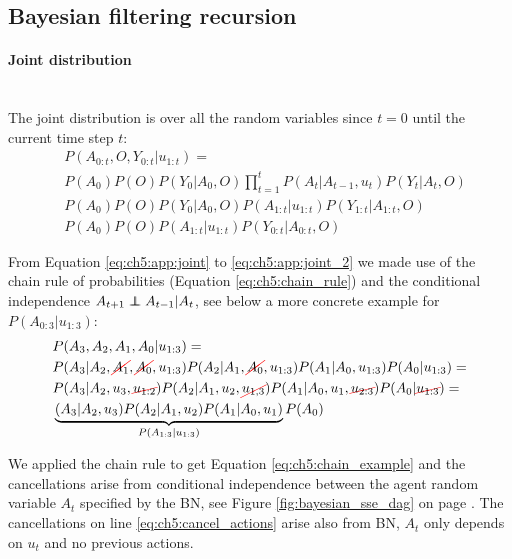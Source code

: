 \begin{appendices}
\section{Bayesian filtering recursion}\label{appendix:bayes_recursion}

\paragraph{Joint distribution}\\

The joint distribution is over all the random variables since $t=0$ until the current 
time step $t$:
\begin{align}
 &P(A_{0:t},O,Y_{0:t}|u_{1:t}) =\nonumber \\ 
 &P(A_0)P(O)P(Y_0|A_0,O)\prod_{t=1}^t P(A_t|A_{t-1},u_{t}) P(Y_t|A_t,O) \label{eq:ch5:app:joint} \\
 &P(A_0)P(O)P(Y_0|A_0,O) P(A_{1:t}|u_{1:t}) P(Y_{1:t}|A_{1:t},O)  \label{eq:ch5:app:joint_2} \\
 &P(A_0)P(O) P(A_{1:t}|u_{1:t}) P(Y_{0:t}|A_{0:t},O) \label{eq:ch5:joint_final}
\end{align}

From Equation \ref{eq:ch5:app:joint} to \ref{eq:ch5:app:joint_2} we made use of the chain rule 
of probabilities (Equation \ref{eq:ch5:chain_rule}) and the conditional independence $A_{t+1} \independent A_{t-1} | A_t$, see below a more concrete example for $P(A_{0:3}|u_{1:3})$:
\begin{align}
  &P(A_3,A_2,A_1,A_0|u_{1:3}) = \nonumber \\ 
  &P(A_3|A_2,\Ccancel[red]{A_1},\Ccancel[red]{A_0},u_{1:3})P(A_2|A_1,\Ccancel[red]{A_0},u_{1:3})P(A_1|A_0,u_{1:3}) P(A_0|u_{1:3}) = \label{eq:ch5:chain_example} \\
  &P(A_3|A_2,u_3,\Ccancel[red]{u_{1:2}})P(A_2|A_1,u_2,\Ccancel[red]{u_{1,3}})P(A_1|A_0,u_1,\Ccancel[red]{u_{2:3}}) P(A_0|\Ccancel[red]{u_{1:3}}) = \label{eq:ch5:cancel_actions} \\
  &\underbrace{(A_3|A_2,u_3) P(A_2|A_1,u_2) P(A_1|A_0,u_1)}_{P(A_{1:3}|u_{1:3})} P(A_0)
\end{align}

We applied the chain rule to get Equation \ref{eq:ch5:chain_example} and the cancellations arise from 
conditional independence between the agent random variable $A_t$ specified by the BN, 
see Figure \ref{fig:bayesian_sse_dag} on page \pageref{fig:bayesian_sse_dag}. The cancellations on line \ref{eq:ch5:cancel_actions}
arise also from BN, $A_t$ only depends on $u_t$ and no previous actions.



\end{appendices}
